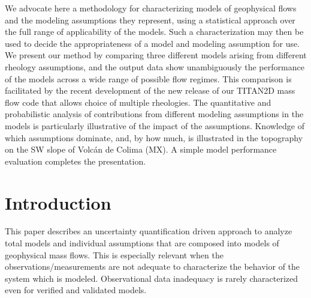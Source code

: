 \documentclass{article}
\begin{document}
We advocate here a methodology for characterizing models of geophysical flows and the modeling assumptions they represent, using a statistical approach over the full range of applicability of the models. Such a characterization may then be used to decide the appropriateness of a model and modeling assumption for use. %
We present our method by comparing three different models arising from different rheology assumptions, and the output data show unambiguously the performance of the models across a wide range of possible flow regimes. This comparison is facilitated by the recent development of the new release of our TITAN2D mass flow code that allows choice of multiple rheologies. The quantitative and probabilistic analysis of contributions from different modeling  assumptions in the models is particularly illustrative of the impact of the assumptions. Knowledge of which assumptions dominate, and, by how much, is illustrated in %
the topography on the SW slope of Volc\'{a}n de Colima (MX). A simple model performance evaluation completes the presentation.

\section{Introduction}
This paper describes an uncertainty quantification driven approach to analyze total models and individual assumptions that are composed  into models of geophysical mass flows.
This is especially relevant when the observations/measurements are not adequate to characterize the behavior of the system which is modeled. Observational { data inadequacy} is rarely characterized even for verified and validated models.
\end{document}
